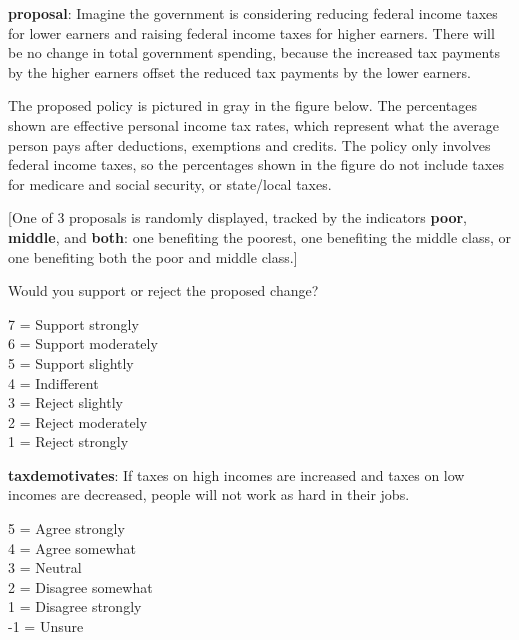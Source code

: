 \documentclass[11pt, headsepline]{article}
\begin{document}






\textbf{proposal}: Imagine the government is considering reducing federal income taxes for lower earners and raising federal income taxes for higher earners. There will be no change in total government spending, because the increased tax payments by the higher earners offset the reduced tax payments by the lower earners.

The proposed policy is pictured in gray in the figure below. The percentages shown are effective personal income tax rates, which represent what the average person pays after deductions, exemptions and credits. The policy only involves federal income taxes, so the percentages shown in the figure do not include taxes for medicare and social security, or state/local taxes.

[One of 3 proposals is randomly displayed, tracked by the indicators \textbf{poor}, \textbf{middle}, and \textbf{both}: one benefiting the poorest, one benefiting the middle class, or one benefiting both the poor and middle class.]

Would you support or reject the proposed change?

7 = Support strongly \\
6 = Support moderately \\
5 = Support slightly \\
4 = Indifferent \\
3 = Reject slightly \\
2 = Reject moderately \\
1 = Reject strongly

\textbf{taxdemotivates}: If taxes on high incomes are increased and taxes on low incomes are decreased, people will not work as hard in their jobs.

5 = Agree strongly \\
4 = Agree somewhat \\
3 = Neutral \\
2 = Disagree somewhat \\
1 = Disagree strongly \\
-1 = Unsure
\end{document}
